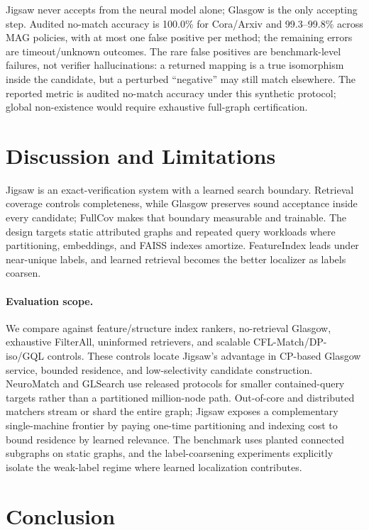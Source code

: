 \documentclass[runningheads]{llncs}
\begin{document}
Jigsaw never accepts from the neural model alone; Glasgow is the only accepting step. Audited no-match accuracy is 100.0\% for Cora/Arxiv and 99.3--99.8\% across MAG policies, with at most one false positive per method; the remaining errors are timeout/unknown outcomes. The rare false positives are benchmark-level failures, not verifier hallucinations: a returned mapping is a true isomorphism inside the candidate, but a perturbed ``negative'' may still match elsewhere. The reported metric is audited no-match accuracy under this synthetic protocol; global non-existence would require exhaustive full-graph certification.

\section{Discussion and Limitations}
\label{sec:limits}

Jigsaw is an exact-verification system with a learned search boundary. Retrieval coverage controls completeness, while Glasgow preserves sound acceptance inside every candidate; FullCov makes that boundary measurable and trainable. The design targets static attributed graphs and repeated query workloads where partitioning, embeddings, and FAISS indexes amortize. FeatureIndex leads under near-unique labels, and learned retrieval becomes the better localizer as labels coarsen.

\paragraph{Evaluation scope.} We compare against feature/structure index rankers, no-retrieval Glasgow, exhaustive FilterAll, uninformed retrievers, and scalable CFL-Match/DP-iso/GQL controls. These controls locate Jigsaw's advantage in CP-based Glasgow service, bounded residence, and low-selectivity candidate construction. NeuroMatch and GLSearch use released protocols for smaller contained-query targets rather than a partitioned million-node path. Out-of-core and distributed matchers stream or shard the entire graph; Jigsaw exposes a complementary single-machine frontier by paying one-time partitioning and indexing cost to bound residence by learned relevance. The benchmark uses planted connected subgraphs on static graphs, and the label-coarsening experiments explicitly isolate the weak-label regime where learned localization contributes.

\section{Conclusion}
\end{document}
